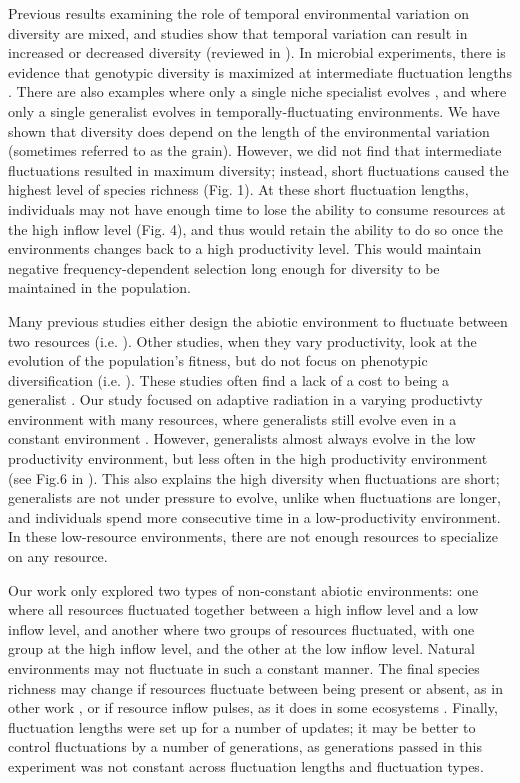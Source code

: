 \documentclass[10pt]{article}
\begin{document}
Previous results examining the role of temporal environmental variation on diversity are mixed, and studies show that temporal variation can result in increased or decreased diversity (reviewed in \cite{kassen2002experimental}). In microbial experiments, there is evidence that genotypic diversity is maximized at intermediate fluctuation lengths \cite{venail2011diversification}. There are also examples where only a single niche specialist evolves \cite{jasmin2007evolution}, and where only a single generalist evolves \cite{reboud1997experimental} in temporally-fluctuating environments. We have shown that diversity does depend on the length of the environmental variation (sometimes referred to as the grain). However, we did not find that intermediate fluctuations resulted in maximum diversity; instead, short fluctuations caused the highest level of species richness (Fig. 1). At these short fluctuation lengths, individuals may not have enough time to lose the ability to consume resources at the high inflow level (Fig. 4), and thus would retain the ability to do so once the environments changes back to a high productivity level. This would maintain negative frequency-dependent selection long enough for diversity to be maintained in the population.

Many previous studies either design the abiotic environment to fluctuate between two resources (i.e. \cite{cooper2010experimental}). Other studies, when they vary productivity, look at the evolution of the population's fitness, but do not focus on phenotypic diversification (i.e. \cite{buckling2007experimental}). These studies often find a lack of a cost to being a generalist \cite{kassen2002experimental}. Our study focused on adaptive radiation in a varying productivty environment with many resources, where generalists still evolve even in a constant environment \cite{chow2004adaptive}. However, generalists almost always evolve in the low productivity environment, but less often in the high productivity environment (see Fig.6 in \cite{chow2004adaptive}). This also explains the high diversity when fluctuations are short; generalists are not under pressure to evolve, unlike when fluctuations are longer, and individuals spend more consecutive time in a low-productivity environment. In these low-resource environments, there are not enough resources to specialize on any resource.

Our work only explored two types of non-constant abiotic environments: one where all resources fluctuated together between a high inflow level and a low inflow level, and another where two groups of resources fluctuated, with one group at the high inflow level, and the other at the low inflow level. Natural environments may not fluctuate in such a constant manner. The final species richness may change if resources fluctuate between being present or absent, as in other work \cite{cooper2010experimental}, or if resource inflow pulses, as it does in some ecosystems \cite{holt2008theoretical}. Finally, fluctuation lengths were set up for a number of updates; it may be better to control fluctuations by a number of generations, as generations passed in this experiment was not constant across fluctuation lengths and fluctuation types. 
\end{document}
